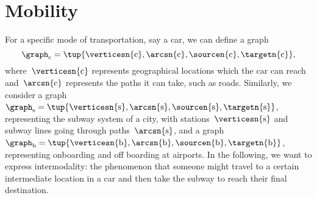 
\section{Mobility}

For a specific mode of transportation, say a car, we can define a graph
\begin{equation}
    \graph_\mathrm{c}=\tup{
        \verticesn{\mathrm{c}},
        \arcsn{\mathrm{c}},
        \sourcen{\mathrm{c}},
        \targetn{\mathrm{c}}
    },
\end{equation}
where~$\verticesn{\mathrm{c}}$ represents geographical locations which the car can reach and~$\arcsn{\mathrm{c}}$ represents the paths it can take, such as roads.
Similarly, we consider a graph~$\graph_\mathrm{s}=\tup{\verticesn{\mathrm{s}},\arcsn{\mathrm{s}},\sourcen{\mathrm{s}},\targetn{\mathrm{s}}}$, representing the subway system of a city, with stations~$\verticesn{\mathrm{s}}$ and subway lines going through paths~$\arcsn{\mathrm{s}}$, and a graph~$\graph_\mathrm{b}=\tup{\verticesn{\mathrm{b}},\arcsn{\mathrm{b}},\sourcen{\mathrm{b}},\targetn{\mathrm{b}}}$, representing onboarding and off boarding at airports.
In the following, we want to express intermodality: the phenomenon that someone might travel to a certain intermediate location in a car and then take the subway to reach their final destination.

